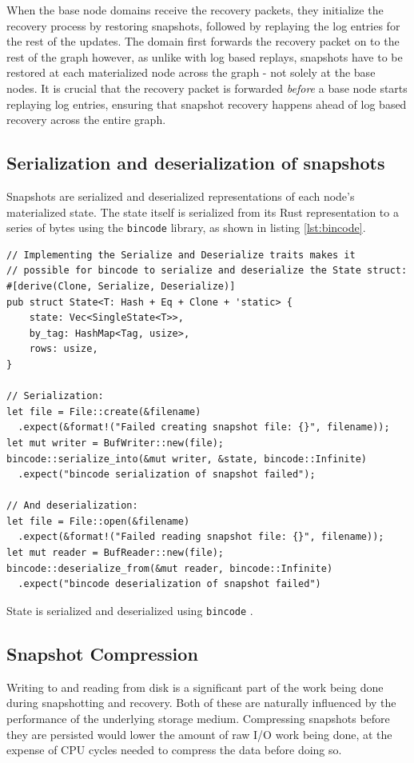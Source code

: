 \documentclass[b5paper]{report}
\begin{document}
When the base node domains receive the recovery packets, they initialize the
recovery process by restoring snapshots, followed by replaying the log entries
for the rest of the updates. The domain first forwards the recovery packet on to
the rest of the graph however, as unlike with log based replays, snapshots have
to be restored at each materialized node across the graph - not solely at the base
nodes. It is crucial that the recovery packet is forwarded \textit{before} a
base node starts replaying log entries, ensuring that snapshot recovery happens
ahead of log based recovery across the entire graph.

\subsection{Serialization and deserialization of snapshots} \label{sec:bincode}
Snapshots are serialized and deserialized representations of each node's
materialized state. The state itself is serialized from its Rust representation
to a series of bytes using the \texttt{bincode} \cite{bincode} library, as shown
in listing \ref{lst:bincode}.

\begin{listing}[H]
  \begin{verbatim}
// Implementing the Serialize and Deserialize traits makes it
// possible for bincode to serialize and deserialize the State struct:
#[derive(Clone, Serialize, Deserialize)]
pub struct State<T: Hash + Eq + Clone + 'static> {
    state: Vec<SingleState<T>>,
    by_tag: HashMap<Tag, usize>,
    rows: usize,
}

// Serialization:
let file = File::create(&filename)
  .expect(&format!("Failed creating snapshot file: {}", filename));
let mut writer = BufWriter::new(file);
bincode::serialize_into(&mut writer, &state, bincode::Infinite)
  .expect("bincode serialization of snapshot failed");

// And deserialization:
let file = File::open(&filename)
  .expect(&format!("Failed reading snapshot file: {}", filename));
let mut reader = BufReader::new(file);
bincode::deserialize_from(&mut reader, bincode::Infinite)
  .expect("bincode deserialization of snapshot failed")
  \end{verbatim}
  \caption{
    State is serialized and deserialized using \texttt{bincode} \cite{bincode}.
    \label{lst:bincode}
  }
\end{listing}

\subsection{Snapshot Compression} \label{sec:compression}
Writing to and reading from disk is a significant part of the work being done
during snapshotting and recovery. Both of these are naturally influenced by the
performance of the underlying storage medium. Compressing snapshots before they
are persisted would lower the amount of raw I/O work being done, at the expense
of CPU cycles needed to compress the data before doing so.
\end{document}

